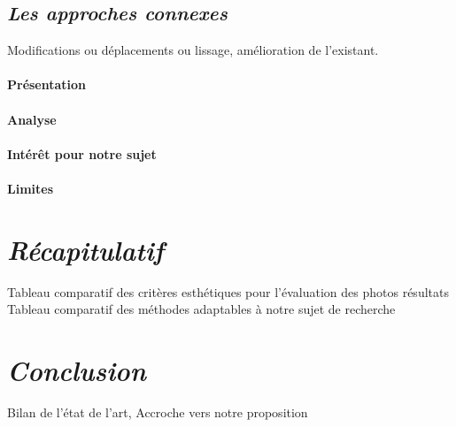 \documentclass[11pt, french]{report-rd-info}
\begin{document}
\subsection{\emph{Les approches connexes}}
Modifications ou déplacements ou lissage, amélioration de l’existant.



\paragraph{Présentation }



\paragraph{Analyse }



\paragraph{Intérêt pour notre sujet }



\paragraph{Limites }




\section{\emph{Récapitulatif}}



Tableau comparatif des critères esthétiques pour l’évaluation des photos résultats
Tableau comparatif des méthodes adaptables à notre sujet de recherche





\section{\emph{Conclusion}}
Bilan de l’état de l’art, Accroche vers notre proposition











\end{document}
